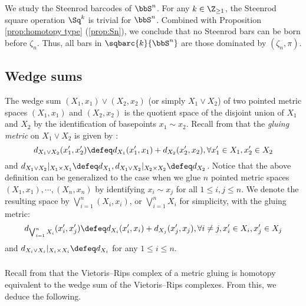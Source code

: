 \subsubsection{} We study the Steenrod barcodes of $\bbS^n$.
For any $k\in \Z_{\geq 1}$, the Steenrod square operation $\Sq^k$ is trivial for $\bbS^n$.
Combined with Proposition \ref{prop:homotopy type} (\ref{prop:Sn}), we conclude that no Steenrod bars can be born before $\zeta_n$.
Thus, all bars in $\sqbarc{k}{\bbS^n}$ are those dominated by  $(\zeta_n,\pi)$.

\subsection{Wedge sums}

The wedge sum $(X_1, x_1)\vee (X_2, x_2)$ (or simply $X_1 \vee X_2$) of two pointed metric spaces $(X_1, x_1)$ and $(X_2, x_2)$ is the quotient space of the disjoint union of $X_1$ and $X_2$ by the identification of basepoints $x_1 \sim x_2$.
Recall from \cite{burago2001course} that the \emph{gluing metric} on $X_1 \vee X_2$ is given by \label{para:gluing}:
\[
d_{X_1\vee X_2}(x_1',x_2') \defeq d_{X_1}(x_1',x_1)+d_{X_2}(x_2',x_2), \forall x_1' \in X_1, x_2' \in X_2
\]
and $d_{X_1 \vee X_2} \vert_{X_1 \times X_1} \defeq d_{X_1},d_{X_1 \vee X_2} \vert_{X_2 \times X_2} \defeq d_{X_2}$.
Notice that the above definition can be generalized to the case when we glue $n$ pointed metric spaces $(X_1,x_1),\cdots,(X_n,x_n)$ by identifying $x_i\sim x_j$ for all $1 \leq i,j\leq n$.
We denote the resulting space by $\bigvee_{i=1}^n (X_i,x_i)$, or $\bigvee_{i=1}^n X_i$ for simplicity, with the gluing metric:
\[
d_{\bigvee_{i=1}^n X_i}(x_i',x_j')\defeq d_{X_i}(x_i',x_i)+d_{X_j}(x_j',x_j),\forall i\neq j, x_i'\in X_i, x_j'\in X_j
\]
and $d_{X_i\vee X_i}|_{X_i\times X_i}\defeq d_{X_i}$ for any $1\leq i\leq n$.

\subsubsection{}\label{prop:wedge sum}
Recall from \cite[Proposition 3.7]{adamaszek2020homotopy} that the Vietoris--Rips complex of a metric gluing is homotopy equivalent to the wedge sum of the Vietoris--Rips complexes.
From this, we deduce the following.

